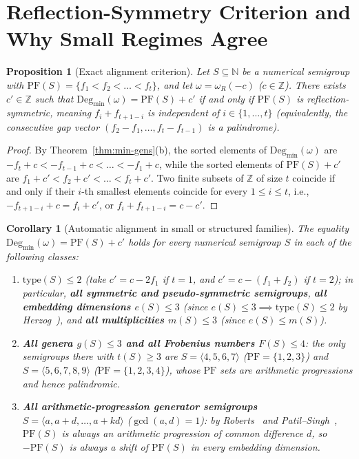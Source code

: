 \documentclass[11pt]{article}
\newtheorem{proposition}[theorem]{Proposition}
\newtheorem{corollary}[theorem]{Corollary}
\theoremstyle{definition}
\theoremstyle{remark}
\begin{document}
\section{Reflection-Symmetry Criterion and Why Small Regimes Agree}

\begin{proposition}[Exact alignment criterion]\label{prop:symmetry}
Let $S \subseteq \mathbb{N}$ be a numerical semigroup with $\mathrm{PF}(S) = \{f_1 < f_2 < \dots < f_t\}$, and let $\omega = \omega_R(-c)$ ($c \in \mathbb{Z}$). There exists $c' \in \mathbb{Z}$ such that $\mathrm{Deg}_{\min}(\omega) = \mathrm{PF}(S) + c'$ if and only if $\mathrm{PF}(S)$ is \emph{reflection-symmetric}, meaning $f_i + f_{t + 1 - i}$ is independent of $i \in \{1, \dots, t\}$ (equivalently, the consecutive gap vector $(f_2 - f_1, \dots, f_t - f_{t-1})$ is a palindrome).
\end{proposition}

\begin{proof}
By Theorem~\ref{thm:min-gens}(b), the sorted elements of $\mathrm{Deg}_{\min}(\omega)$ are $-f_t + c < -f_{t-1} + c < \dots < -f_1 + c$, while the sorted elements of $\mathrm{PF}(S) + c'$ are $f_1 + c' < f_2 + c' < \dots < f_t + c'$. Two finite subsets of $\mathbb{Z}$ of size $t$ coincide if and only if their $i$-th smallest elements coincide for every $1 \le i \le t$, i.e., $-f_{t + 1 - i} + c = f_i + c'$, or $f_i + f_{t + 1 - i} = c - c'$.
\end{proof}

\begin{corollary}[Automatic alignment in small or structured families]\label{cor:small-regimes}
The equality $\mathrm{Deg}_{\min}(\omega) = \mathrm{PF}(S) + c'$ holds for \emph{every} numerical semigroup $S$ in each of the following classes:
\begin{enumerate}
  \item[(1)] $\mathrm{type}(S) \le 2$ (take $c' = c - 2f_1$ if $t = 1$, and $c' = c - (f_1 + f_2)$ if $t = 2$); in particular, \textbf{all symmetric and pseudo-symmetric semigroups}, \textbf{all embedding dimensions $e(S) \le 3$} (since $e(S) \le 3 \implies \mathrm{type}(S) \le 2$ by Herzog~\cite{Herzog70}), and \textbf{all multiplicities $m(S) \le 3$} (since $e(S) \le m(S)$).
  \item[(2)] \textbf{All genera $g(S) \le 3$ and all Frobenius numbers $F(S) \le 4$}: the only semigroups there with $t(S) \ge 3$ are $S = \langle 4, 5, 6, 7 \rangle$ ($\mathrm{PF} = \{1, 2, 3\}$) and $S = \langle 5, 6, 7, 8, 9 \rangle$ ($\mathrm{PF} = \{1, 2, 3, 4\}$), whose $\mathrm{PF}$ sets are arithmetic progressions and hence palindromic.
  \item[(3)] \textbf{All arithmetic-progression generator semigroups} $S = \langle a, a + d, \dots, a + k d \rangle$ ($\gcd(a, d) = 1$): by Roberts~\cite{Roberts} and Patil--Singh~\cite{PS}, $\mathrm{PF}(S)$ is always an arithmetic progression of common difference $d$, so $-\mathrm{PF}(S)$ is always a shift of $\mathrm{PF}(S)$ in \emph{every} embedding dimension.
\end{enumerate}
\end{corollary}
\end{document}
